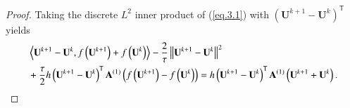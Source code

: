 \documentclass{siamart171218}
\numberwithin{theorem}{section}
\numberwithin{equation}{section}
\begin{document}
\begin{proof}
Taking the discrete $L^2$ inner product of (\ref{eq.3.1}) with
$\left(\mathbf{U}^{k+1}-\mathbf{U}^k\right)^{\mathsf{T}}$ yields
\begin{equation}\label{eq.3.20}
\begin{aligned}\displaystyle
&\left<\mathbf{U}^{k+1}-\mathbf{U}^k,f\left(\mathbf{U}^{k+1}\right)+f\left(\mathbf{U}^{k}\right)\right>
-\frac{2}{\tau}\left\|\mathbf{U}^{k+1}-\mathbf{U}^k\right\|^2\\
&+\frac{\tau}{2} h\left(\mathbf{U}^{k+1}-\mathbf{U}^k\right)^{\mathsf{T}}\mathbf{A}^{(1)}\left(
 f\left(\mathbf{U}^{k+1}\right)- f\left(\mathbf{U}^{k}\right)\right)
=h\left(\mathbf{U}^{k+1}-\mathbf{U}^k\right)^{\mathsf{T}}
\mathbf{A}^{(1)}\left(\mathbf{U}^{k+1}+\mathbf{U}^{k}\right).
\end{aligned}
\end{equation}


\end{proof}
\end{document}
